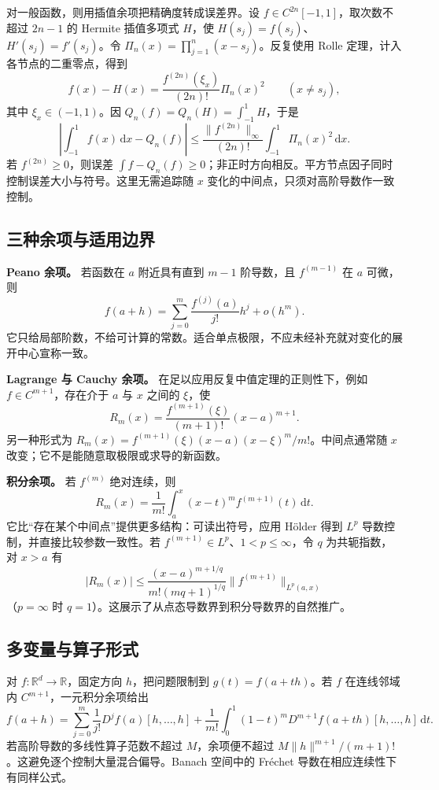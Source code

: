 \documentclass[12pt,fontset=fandol]{ctexart}
\begin{document}
对一般函数，则用插值余项把精确度转成误差界。设 $f\in C^{2n}[-1,1]$，取次数不超过 $2n-1$ 的 Hermite 插值多项式 $H$，使 $H(s_j)=f(s_j)$、$H'(s_j)=f'(s_j)$。令 $\Pi_n(x)=\prod_{j=1}^n(x-s_j)$。反复使用 Rolle 定理，计入各节点的二重零点，得到
\[
f(x)-H(x)=\frac{f^{(2n)}(\xi_x)}{(2n)!}\Pi_n(x)^2
\qquad(x\ne s_j),
\]
其中 $\xi_x\in(-1,1)$。因 $Q_n(f)=Q_n(H)=\int_{-1}^1H$，于是
\[
\left|\int_{-1}^1f(x)\,\mathrm dx-Q_n(f)\right|
\le\frac{\|f^{(2n)}\|_\infty}{(2n)!}
\int_{-1}^1\Pi_n(x)^2\,\mathrm dx.
\]
若 $f^{(2n)}\ge0$，则误差 $\int f-Q_n(f)\ge0$；非正时方向相反。平方节点因子同时控制误差大小与符号。这里无需追踪随 $x$ 变化的中间点，只须对高阶导数作一致控制。

\subsection{三种余项与适用边界}

\label{app:taylor-forms}

\textbf{Peano 余项。} 若函数在 $a$ 附近具有直到 $m-1$ 阶导数，且 $f^{(m-1)}$ 在 $a$ 可微，则
\[
f(a+h)=\sum_{j=0}^m\frac{f^{(j)}(a)}{j!}h^j+o(h^m).
\]
它只给局部阶数，不给可计算的常数。适合单点极限，不应未经补充就对变化的展开中心宣称一致。

\textbf{Lagrange 与 Cauchy 余项。} 在足以应用反复中值定理的正则性下，例如 $f\in C^{m+1}$，存在介于 $a$ 与 $x$ 之间的 $\xi$，使
\[
R_m(x)=\frac{f^{(m+1)}(\xi)}{(m+1)!}(x-a)^{m+1}.
\]
另一种形式为 $R_m(x)=f^{(m+1)}(\xi)(x-a)(x-\xi)^m/m!$。中间点通常随 $x$ 改变；它不是能随意取极限或求导的新函数。

\textbf{积分余项。} 若 $f^{(m)}$ 绝对连续，则
\[
R_m(x)=\frac1{m!}\int_a^x(x-t)^mf^{(m+1)}(t)\,\mathrm dt.
\]
它比“存在某个中间点”提供更多结构：可读出符号，应用 Hölder 得到 $L^p$ 导数控制，并直接比较参数一致性。若 $f^{(m+1)}\in L^p$、$1<p\leq\infty$，令 $q$ 为共轭指数，对 $x>a$ 有
\[
|R_m(x)|\leq\frac{(x-a)^{m+1/q}}{m!(mq+1)^{1/q}}
\|f^{(m+1)}\|_{L^p(a,x)}
\]
（$p=\infty$ 时 $q=1$）。这展示了从点态导数界到积分导数界的自然推广。

\subsection{多变量与算子形式}

\label{app:taylor-multivariable}

对 $f:\mathbb R^d\to\mathbb R$，固定方向 $h$，把问题限制到 $g(t)=f(a+th)$。若 $f$ 在连线邻域内 $C^{m+1}$，一元积分余项给出
\[
f(a+h)=\sum_{j=0}^m\frac1{j!}D^jf(a)[h,\ldots,h]
+\frac1{m!}\int_0^1(1-t)^mD^{m+1}f(a+th)[h,\ldots,h]\,\mathrm dt.
\]
若高阶导数的多线性算子范数不超过 $M$，余项便不超过 $M\|h\|^{m+1}/(m+1)!$。这避免逐个控制大量混合偏导。Banach 空间中的 Fréchet 导数在相应连续性下有同样公式。
\end{document}

